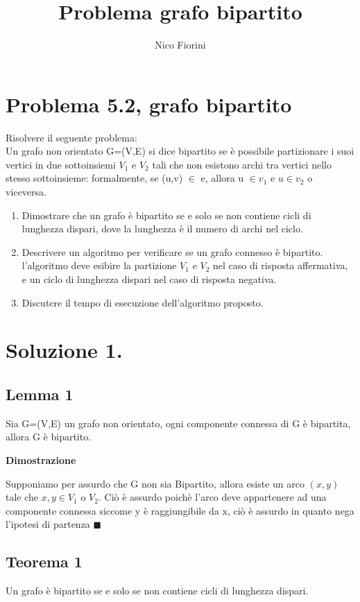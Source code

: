 \documentclass{article}
\begin{document}
\author{Nico Fiorini}
\date{}

\title{Problema grafo bipartito }
\maketitle
\section{Problema 5.2, grafo bipartito}

Risolvere il seguente problema: \\
Un grafo non orientato G=(V,E) si dice bipartito se è possibile
partizionare i suoi vertici in due sottoinsiemi $V_{1}$ e $V_{2}$ 
tali che non esistono archi tra vertici nello stesso sottoinsieme: 
formalmente, se (u,v) $\in$ e, allora u $\in v_{1}$ e $u \in v_{2}$
o viceversa. 
\begin{enumerate}
  \item  Dimostrare che un grafo è bipartito se e solo se non contiene 
         cicli di lunghezza dispari, dove la lunghezza è il numero di 
         archi nel ciclo.
  \item  Descrivere un algoritmo per verificare se un grafo connesso è bipartito. 
  l’algoritmo deve esibire la partizione $V_{1}$ e $V_{2}$ nel caso di 
  risposta affermativa, e un ciclo di lunghezza dispari nel caso di risposta negativa. 
  \item Discutere il tempo di esecuzione dell'algoritmo proposto.
\end{enumerate}

\section*{Soluzione 1.}

\subsection{Lemma 1} 
Sia G=(V,E) un grafo non orientato, ogni componente connessa di G è bipartita,
allora G è bipartito.

\textbf{Dimostrazione} 

Supponiamo per assurdo che G non sia Bipartito, allora esiste un arco $(x,y)$ 
tale che $x,y \in V_{1}$ o $V_{2}$. 
Ciò è assurdo poichè l'arco deve appartenere ad una componente connessa siccome y
è raggiungibile da x, ciò è assurdo in quanto nega l'ipotesi di partenza $\blacksquare$ 

\subsection*{Teorema 1}
Un grafo è bipartito se e solo se non contiene cicli di lunghezza
dispari.
\end{document}
